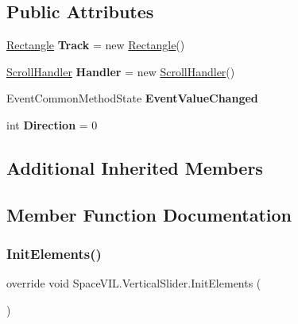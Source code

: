 \subsection*{Public Attributes}
\begin{DoxyCompactItemize}
\item 
\mbox{\label{class_space_v_i_l_1_1_vertical_slider_a8b25ba3af337ee1800723ac28013497d}} 
\mbox{\hyperlink{class_space_v_i_l_1_1_rectangle}{Rectangle}} {\bfseries Track} = new \mbox{\hyperlink{class_space_v_i_l_1_1_rectangle}{Rectangle}}()
\item 
\mbox{\label{class_space_v_i_l_1_1_vertical_slider_ab383c5777fc2a267b855dc1a05dce681}} 
\mbox{\hyperlink{class_space_v_i_l_1_1_scroll_handler}{Scroll\+Handler}} {\bfseries Handler} = new \mbox{\hyperlink{class_space_v_i_l_1_1_scroll_handler}{Scroll\+Handler}}()
\item 
\mbox{\label{class_space_v_i_l_1_1_vertical_slider_a817704bf35e4d9c6c0efb39cb25b10f6}} 
Event\+Common\+Method\+State {\bfseries Event\+Value\+Changed}
\item 
\mbox{\label{class_space_v_i_l_1_1_vertical_slider_a3f132d2a9edac29a1de9a6561c014d0d}} 
int {\bfseries Direction} = 0
\end{DoxyCompactItemize}
\subsection*{Additional Inherited Members}


\subsection{Member Function Documentation}
\mbox{\label{class_space_v_i_l_1_1_vertical_slider_a22ab138c5fbb0bdc8c56f7673998dfcb}} 
\subsubsection{\texorpdfstring{Init\+Elements()}{InitElements()}}
{\footnotesize\ttfamily override void Space\+V\+I\+L.\+Vertical\+Slider.\+Init\+Elements (\begin{DoxyParamCaption}{ }\end{DoxyParamCaption})\hspace{0.3cm}{\ttfamily [virtual]}}



